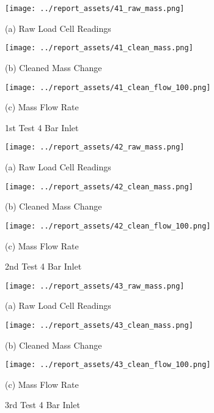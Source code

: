 \begin{figure}[htbp]
    \centering

    \begin{minipage}{0.32\textwidth}
        \centering
        \texttt{[image: ../report\_assets/41\_raw\_mass.png]}
        \caption*{(a) Raw Load Cell Readings}
    \end{minipage}
    \hfill
    \begin{minipage}{0.32\textwidth}
        \centering
        \texttt{[image: ../report\_assets/41\_clean\_mass.png]}
        \caption*{(b) Cleaned Mass Change}
    \end{minipage}
    \hfill
    \begin{minipage}{0.32\textwidth}
        \centering
        \texttt{[image: ../report\_assets/41\_clean\_flow\_100.png]}
        \caption*{(c) Mass Flow Rate}
    \end{minipage}
    \caption{1st Test 4 Bar Inlet}

\end{figure}\label{fig:41}
\vfill
\begin{figure}[htbp]
    \centering

    \begin{minipage}{0.32\textwidth}
        \centering
        \texttt{[image: ../report\_assets/42\_raw\_mass.png]}
        \caption*{(a) Raw Load Cell Readings}
    \end{minipage}
    \hfill
    \begin{minipage}{0.32\textwidth}
        \centering
        \texttt{[image: ../report\_assets/42\_clean\_mass.png]}
        \caption*{(b) Cleaned Mass Change}
    \end{minipage}
    \hfill
    \begin{minipage}{0.32\textwidth}
        \centering
        \texttt{[image: ../report\_assets/42\_clean\_flow\_100.png]}
        \caption*{(c) Mass Flow Rate}
    \end{minipage}
    \caption{2nd Test 4 Bar Inlet}
    
\end{figure}\label{fig:42}
\vfill
\begin{figure}[htbp]
    \centering

    \begin{minipage}{0.32\textwidth}
        \centering
        \texttt{[image: ../report\_assets/43\_raw\_mass.png]}
        \caption*{(a) Raw Load Cell Readings}
    \end{minipage}
    \hfill
    \begin{minipage}{0.32\textwidth}
        \centering
        \texttt{[image: ../report\_assets/43\_clean\_mass.png]}
        \caption*{(b) Cleaned Mass Change}
    \end{minipage}
    \hfill
    \begin{minipage}{0.32\textwidth}
        \centering
        \texttt{[image: ../report\_assets/43\_clean\_flow\_100.png]}
        \caption*{(c) Mass Flow Rate}
    \end{minipage}
    \caption{3rd Test 4 Bar Inlet}
    
\end{figure}\label{fig:43}

